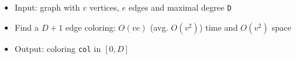 \begin{itemize}
	\item Input: graph with $v$ vertices, $e$ edges and maximal degree \lstinline{D}
	\item Find a $D + 1$ edge coloring: $O(ve)$ (avg. $O(v^2)$) time and $O(v^2)$ space
	\item Output: coloring \lstinline{col} in $[0,D]$
\end{itemize}
